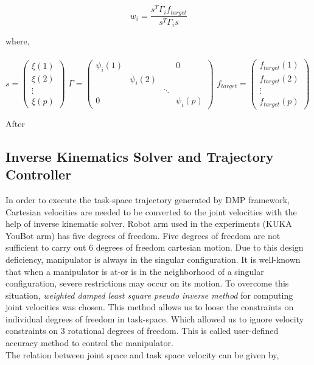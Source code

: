 \begin{equation}
	w_{i} = \frac{s^{T}\Gamma_{i}f_{target}}{s^{T}\Gamma_{i}s}
\end{equation}

where,\\
\\
\vspace{1cm}
$
s = 
\begin{pmatrix}
\xi(1) \\
\xi(2) \\
\vdots  \\
\xi(p) 
\end{pmatrix}
$
$
\Gamma = 
\begin{pmatrix}
	\psi_{i}(1) &   &  & 0 \\
	 &\psi_{i}(2)&  &  \\
	 &  & \ddots &   \\
	0 &  &  & \psi_{i}(p)
\end{pmatrix}
$
$
f_{target} = 
\begin{pmatrix}
f_{target}(1) \\
f_{target}(2) \\
\vdots  \\
f_{target}(p) 
\end{pmatrix}
$


 

After 

 




\subsection{Inverse Kinematics Solver and Trajectory Controller}

In order to execute the task-space trajectory generated by DMP framework, Cartesian velocities are needed to be converted to the joint velocities with the help of inverse kinematic solver. Robot arm used in the experiments (KUKA YouBot arm) has five degrees of freedom. Five degrees of freedom are not sufficient to carry out 6 degrees of freedom cartesian motion. Due to this design deficiency, manipulator is always in the singular configuration. It is well-known that when a manipulator is at-or is in the neighborhood of a singular configuration, severe restrictions may occur on its motion. To overcome this situation, \textit{weighted damped least square pseudo inverse method} for computing joint velocities was chosen. This method allows us to loose the constraints on individual degrees of freedom in task-space. Which allowed us to ignore velocity constraints on 3 rotational degrees of freedom. This is called user-defined accuracy method to control the manipulator. \cite{chiaverini1994review}
\\
The relation between joint space and task space velocity can be given by, 

